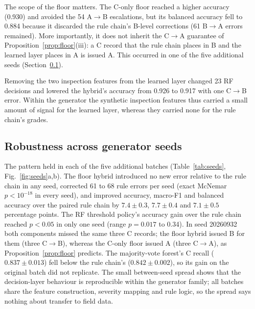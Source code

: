 \documentclass[journal]{IEEEtran}
\newcommand{\CtoA}{C$\rightarrow$A}
\newcommand{\CtoB}{C$\rightarrow$B}
\newcommand{\BtoA}{B$\rightarrow$A}
\newcommand{\AtoB}{A$\rightarrow$B}
\begin{document}
The scope of the floor matters. The C-only floor reached a higher accuracy (0.930) and avoided the 54 \AtoB{} escalations, but its balanced accuracy fell to 0.884 because it discarded the rule chain's B-level corrections (61 \BtoA{} errors remained). More importantly, it does not inherit the \CtoA{} guarantee of Proposition~\ref{prop:floor}(iii): a C record that the rule chain places in B and the learned layer places in A is issued A. This occurred in one of the five additional seeds (Section~\ref{sec:res-robust}).

Removing the two inspection features from the learned layer changed 23 RF decisions and lowered the hybrid's accuracy from 0.926 to 0.917 with one \CtoB{} error. Within the generator the synthetic inspection features thus carried a small amount of signal for the learned layer, whereas they carried none for the rule chain's grades.

\subsection{Robustness across generator seeds}
\label{sec:res-robust}

The pattern held in each of the five additional batches (Table~\ref{tab:seeds}, Fig.~\ref{fig:seeds}a,b). The floor hybrid introduced no new error relative to the rule chain in any seed, corrected 61 to 68 rule errors per seed (exact McNemar $p<10^{-18}$ in every seed), and improved accuracy, macro-F1 and balanced accuracy over the paired rule chain by $7.4\pm0.3$, $7.7\pm0.4$ and $7.1\pm0.5$ percentage points. The RF threshold policy's accuracy gain over the rule chain reached $p<0.05$ in only one seed (range $p=0.017$ to 0.34). In seed 20260932 both components missed the same three C records; the floor hybrid issued B for them (three \CtoB), whereas the C-only floor issued A (three \CtoA), as Proposition~\ref{prop:floor} predicts. The majority-vote forest's C recall ($0.837\pm0.013$) fell below the rule chain's ($0.842\pm0.002$), so its gain on the original batch did not replicate. The small between-seed spread shows that the decision-layer behaviour is reproducible within the generator family; all batches share the feature construction, severity mapping and rule logic, so the spread says nothing about transfer to field data.
\end{document}
